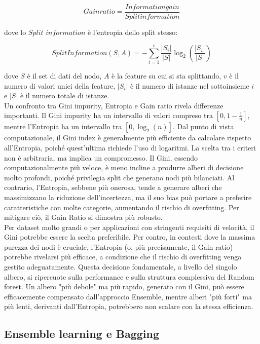 \documentclass[a4paper,12pt]{report}
\begin{document}
	$$Gain ratio = \frac{Information gain}{Split information}$$
	
	dove lo $Split$ $information$ è l'entropia dello split stesso:
	
	$$Split Information(S, A) = - \sum_{i=1}^{v} \frac{|S_i|}{|S|} \log_2(\frac{|S_i|}{|S|})$$
	
	dove $S$ è il set di dati del nodo, $A$ è la feature su cui si sta splittando, $v$ è il numero di valori unici della feature, $|S_i|$ è il numero di istanze nel sottoinsieme $i$ e $|S|$ è il numero totale di istanze. \\
	Un confronto tra Gini impurity, Entropia e Gain ratio rivela differenze importanti. Il Gini impurity ha un intervallo di valori compreso tra $[0, 1 - \frac{1}{n}]$, mentre l'Entropia ha un intervallo tra $[0, \log_2(n)]$. Dal punto di vista computazionale, il Gini index è generalmente più efficiente da calcolare rispetto all'Entropia, poiché quest'ultima richiede l'uso di logaritmi. La scelta tra i criteri non è arbitraria, ma implica un compromesso. Il Gini, essendo computazionalmente più veloce, è meno incline a produrre alberi di decisione molto profondi, poiché privilegia split che generano nodi più bilanciati. Al contrario, l'Entropia, sebbene più onerosa, tende a generare alberi che massimizzano la riduzione dell'incertezza, ma il suo bias può portare a preferire caratteristiche con molte categorie, aumentando il rischio di overfitting. Per mitigare ciò, il Gain Ratio si dimostra più robusto. \\
	Per dataset molto grandi o per applicazioni con stringenti requisiti di velocità, il Gini potrebbe essere la scelta preferibile. Per contro, in contesti dove la massima purezza dei nodi è cruciale, l'Entropia (o, più precisamente, il Gain ratio) potrebbe rivelarsi più efficace, a condizione che il rischio di overfitting venga gestito adeguatamente. Questa decisione fondamentale, a livello del singolo albero, si ripercuote sulla performance e sulla struttura complessiva del Random forest. Un albero "più debole" ma più rapido, generato con il Gini, può essere efficacemente compensato dall'approccio Ensemble, mentre alberi "più forti" ma più lenti, derivanti dall'Entropia, potrebbero non scalare con la stessa efficienza.
	
	\subsection{Ensemble learning e Bagging}
	
\end{document}
